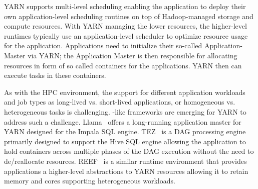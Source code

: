 \documentclass{sig-alternate}
\begin{document}
YARN supports multi-level scheduling enabling the application to deploy their
own application-level scheduling routines on top of Hadoop-managed storage and
compute resources. With YARN managing the lower resources, the higher-level
runtimes typically use an application-level scheduler to optimize resource usage
for the application. Applications need to initialize their so-called
Application-Master via YARN; the Application Master is then responsible for
allocating resources in form of so called containers for the applications. YARN
then can execute tasks in these containers.

As with the HPC environment, the support for different application workloads and
job types as long-lived vs. short-lived applications, or homogeneous vs.
heterogeneous tasks is challenging. \pilot-like frameworks are emerging for YARN
to address such a challenge. Llama~\cite{llama} offers a long-running
application master for YARN designed for the Impala SQL engine. TEZ~\cite{tez}
is a DAG processing engine primarily designed to support the Hive SQL engine
allowing the application to hold containers across multiple phases of the DAG
execution without the need to de/reallocate resources.
REEF~\cite{Chun:2013:RRE:2536274.2536318} is a similar runtime environment that
provides applications a higher-level abstractions to YARN resources allowing it
to retain memory and cores supporting heterogeneous workloads.

 

\end{document}

